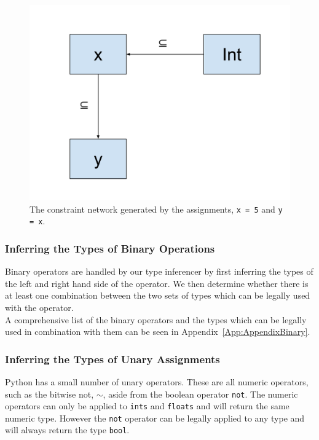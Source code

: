 \documentclass[12pt, titlepage]{article}
\begin{document}
\begin{figure}
\centering
\includegraphics[scale=0.3]{images/assignment_constraint.pdf}
\caption{The constraint network generated by the assignments, \texttt{x = 5} and \texttt{y = x}.}
\label{fig:assignConstraint}
\end{figure}

\subsubsection{Inferring the Types of Binary Operations}
Binary operators are handled by our type inferencer by first inferring the types of the left and right hand side of the operator. We then determine whether there is at least one combination between the two sets of types which can be legally used with the operator. \\
A comprehensive list of the binary operators and the types which can be legally used in combination with them can be seen in Appendix~\ref{App:AppendixBinary}.


\subsubsection{Inferring the Types of Unary Assignments}
Python has a small number of unary operators. These are all numeric operators, such as the bitwise not, $\sim$, aside from the boolean operator \texttt{not}. The numeric operators can only be applied to \texttt{ints} and \texttt{floats} and will return the same numeric type. However the \texttt{not} operator can be legally applied to any type and will always return the type \texttt{bool}.
\end{document}
